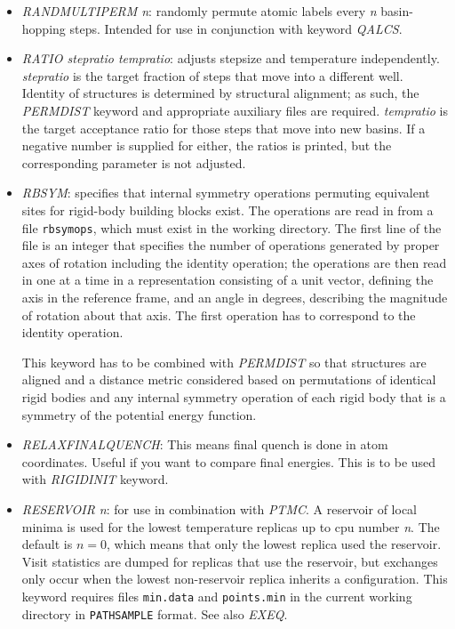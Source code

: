 \documentclass[12pt,a4paper,dvips]{article}
\begin{document}
\begin{itemize}
\item{\it RANDMULTIPERM n\/}: randomly permute atomic labels every {\it n\/} basin-hopping steps. Intended for use in conjunction with keyword {\it QALCS\/}. 

\item {\it RATIO stepratio tempratio\/}: adjusts stepsize and temperature independently.
{\it stepratio} is the target fraction of steps that move into a different well. Identity of
structures is determined by structural alignment; as such, the {\it PERMDIST} keyword and
appropriate auxiliary files are required. {\it tempratio} is the target acceptance ratio for
those steps that move into new basins. If a negative number is supplied for either, the
ratios is printed, but the corresponding parameter is not adjusted.

\item {\it RBSYM\/}: specifies that internal symmetry operations permuting equivalent sites for
rigid-body building blocks exist. The operations are read in from a file {\tt rbsymops}, which must
exist in the working directory. The first line of the file is an integer that specifies the number
of operations generated by proper axes of rotation including the identity operation; the operations
are then read in one at a time in a representation consisting of a unit vector, defining the
axis in the reference frame, and an angle in degrees, describing the magnitude of rotation about
that axis. The first operation has to correspond to the identity operation.

This keyword has to be combined with {\it PERMDIST\/} so that structures are aligned and
a distance metric considered based on permutations of identical rigid
bodies and any internal symmetry operation of each rigid body that is a symmetry
of the potential energy function.



\item {\it RELAXFINALQUENCH\/}: This means final quench is done in atom coordinates. Useful if you want to compare final energies. This is to be used with {\it RIGIDINIT\/} keyword.

\item {\it RESERVOIR n\/}: for use in combination with {\it PTMC}. A reservoir of local minima
is used for the lowest temperature replicas up to cpu number {\it n}. The default is
$n=0$, which means that only the lowest replica used the reservoir. Visit statistics are
dumped for replicas that use the reservoir, but exchanges only occur when the lowest
non-reservoir replica inherits a configuration. This keyword requires files
{\tt min.data} and {\tt points.min} in the current working directory in {\tt PATHSAMPLE}
format. See also {\it EXEQ\/}.


\end{itemize}
\end{document}
